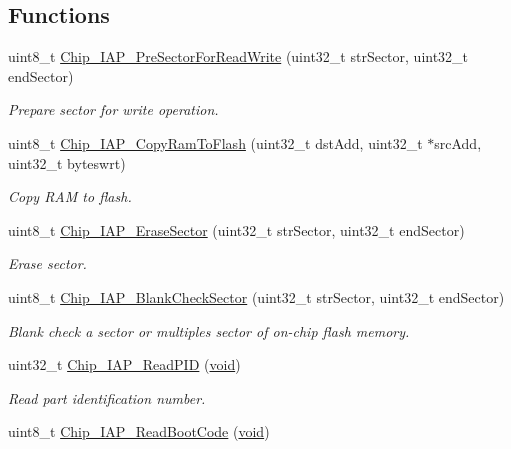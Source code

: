 \subsection*{Functions}
\begin{DoxyCompactItemize}
\item 
uint8\-\_\-t \hyperlink{group__COMMON__IAP_gac45b60745e55670c7fa806e2865625c4}{Chip\-\_\-\-I\-A\-P\-\_\-\-Pre\-Sector\-For\-Read\-Write} (uint32\-\_\-t str\-Sector, uint32\-\_\-t end\-Sector)
\begin{DoxyCompactList}\small\item\em Prepare sector for write operation. \end{DoxyCompactList}\item 
uint8\-\_\-t \hyperlink{group__COMMON__IAP_ga71cb8cde86dc344b05219cdf1ecee638}{Chip\-\_\-\-I\-A\-P\-\_\-\-Copy\-Ram\-To\-Flash} (uint32\-\_\-t dst\-Add, uint32\-\_\-t $\ast$src\-Add, uint32\-\_\-t byteswrt)
\begin{DoxyCompactList}\small\item\em Copy R\-A\-M to flash. \end{DoxyCompactList}\item 
uint8\-\_\-t \hyperlink{group__COMMON__IAP_ga02dbb90a49e24dc449d45a66f03a4a2d}{Chip\-\_\-\-I\-A\-P\-\_\-\-Erase\-Sector} (uint32\-\_\-t str\-Sector, uint32\-\_\-t end\-Sector)
\begin{DoxyCompactList}\small\item\em Erase sector. \end{DoxyCompactList}\item 
uint8\-\_\-t \hyperlink{group__COMMON__IAP_ga98c7e657a618cf004a8967112dae1a30}{Chip\-\_\-\-I\-A\-P\-\_\-\-Blank\-Check\-Sector} (uint32\-\_\-t str\-Sector, uint32\-\_\-t end\-Sector)
\begin{DoxyCompactList}\small\item\em Blank check a sector or multiples sector of on-\/chip flash memory. \end{DoxyCompactList}\item 
uint32\-\_\-t \hyperlink{group__COMMON__IAP_gaa4b90551649db0627dc195acfc834cbe}{Chip\-\_\-\-I\-A\-P\-\_\-\-Read\-P\-I\-D} (\hyperlink{Paradigm_2Tern__EE_2small_2portmacro_8h_a14d32f8130d3c0b212cfc751730b5b49}{void})
\begin{DoxyCompactList}\small\item\em Read part identification number. \end{DoxyCompactList}\item 
uint8\-\_\-t \hyperlink{group__COMMON__IAP_ga478acfa6d97211d4f43edfa8717dc066}{Chip\-\_\-\-I\-A\-P\-\_\-\-Read\-Boot\-Code} (\hyperlink{Paradigm_2Tern__EE_2small_2portmacro_8h_a14d32f8130d3c0b212cfc751730b5b49}{void})

\end{DoxyCompactItemize}
